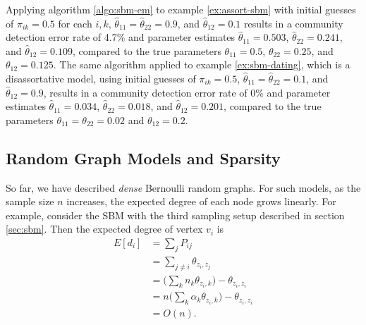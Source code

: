 \documentclass[
  11pt,
]{article}
\theoremstyle{definition}
\theoremstyle{definition}
\theoremstyle{definition}
\theoremstyle{definition}
\theoremstyle{remark}
\begin{document}
Applying algorithm \ref{algo:sbm-em} to example \ref{ex:assort-sbm} with initial guesses of \(\pi_{ik} = 0.5\) for each \(i, k\), \(\hat{\theta}_{11} = \hat{\theta}_{22} = 0.9\), and \(\hat{\theta}_{12} = 0.1\) results in a community detection error rate of 4.7\% and parameter estimates \(\hat{\theta}_{11} = 0.503\), \(\hat{\theta}_{22} = 0.241\), and \(\hat{\theta}_{12} = 0.109\), compared to the true parameters \(\theta_{11} = 0.5\), \(\theta_{22} = 0.25\), and \(\theta_{12} = 0.125\).
The same algorithm applied to example \ref{ex:sbm-dating}, which is a disassortative model, using initial guesses of \(\pi_{ik} = 0.5\), \(\hat{\theta}_{11} = \hat{\theta}_{22} = 0.1\), and \(\hat{\theta}_{12} = 0.9\), results in a community detection error rate of 0\% and parameter estimates \(\hat{\theta}_{11} = 0.034\), \(\hat{\theta}_{22} = 0.018\), and \(\hat{\theta}_{12} = 0.201\), compared to the true parameters \(\theta_{11} = \theta_{22} = 0.02\) and \(\theta_{12} = 0.2\).

\hypertarget{sec:sparsity}{%
\subsection{Random Graph Models and Sparsity}\label{sec:sparsity}}

So far, we have described \emph{dense} Bernoulli random graphs.
For such models, as the sample size \(n\) increases, the expected degree of each node grows linearly.
For example, consider the SBM with the third sampling setup described in section \ref{sec:sbm}.
Then the expected degree of vertex \(v_i\) is
\[
\begin{split}
E[d_i] & = \sum_j P_{ij} \\
& = \sum_{j \neq i} \theta_{z_i, z_j} \\ 
& = \Big( \sum_k n_k \theta_{z_i, k} \Big) - \theta_{z_i, z_i} \\
& = n \Big( \sum_k \alpha_k \theta_{z_i, k} \Big) - \theta_{z_i, z_i} \\
& = O(n).
\end{split}
\]
\end{document}
